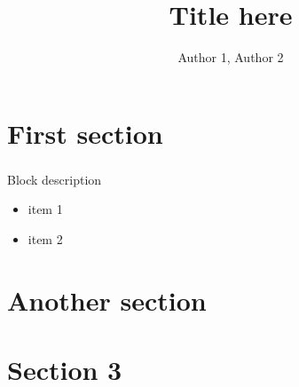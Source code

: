 \documentclass{beamer}
\begin{document}
\title{Title here}
\author{Author 1, Author 2}

\begin{frame}
  \titlepage
\end{frame}
 
\section{First section}
\begin{frame}
  \frametitle{\insertsection}
  \begin{block}{Block description}
    \begin{itemize}
     \item item 1
     \item item 2
    \end{itemize}   
  \end{block}
\end{frame}

\section{Another section}
\begin{frame}
  \frametitle{\insertsection}
\end{frame}

\section{Section 3}
\begin{frame}

\end{frame}
\end{document}
